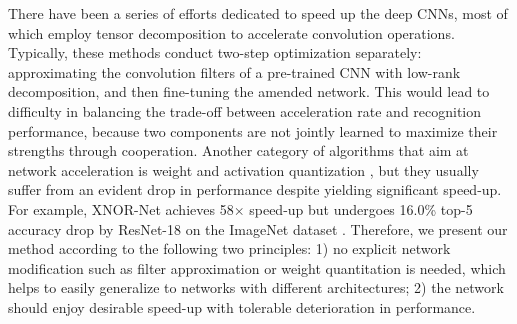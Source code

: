 \documentclass[letterpaper]{article} %
\begin{document}
There have been a series of efforts dedicated to speed up the deep CNNs, most of which \cite{lebedev2014speeding,tai2015convolutional} employ tensor decomposition to accelerate convolution operations. Typically, these methods conduct two-step optimization separately: approximating the convolution filters of a pre-trained CNN with low-rank decomposition, and then fine-tuning the amended network. This would lead to difficulty in balancing the trade-off between acceleration rate and recognition performance, because two components are not jointly learned to maximize their strengths through cooperation. Another category of algorithms that aim at network acceleration is weight and activation quantization \cite{rastegari2016xnor,cai2017deep,chen2015compressing}, but they usually suffer from an evident drop in performance despite yielding significant speed-up. For example, XNOR-Net \cite{rastegari2016xnor} achieves 58$\times$ speed-up but undergoes 16.0\% top-5 accuracy drop by ResNet-18 on the ImageNet dataset \cite{russakovsky2015imagenet}. Therefore, we present our method according to the following two principles: 1) no explicit network modification such as filter approximation or weight quantitation is needed, which helps to easily generalize to networks with different architectures; 2) the network should enjoy desirable speed-up with tolerable deterioration in performance. 

\end{document}
